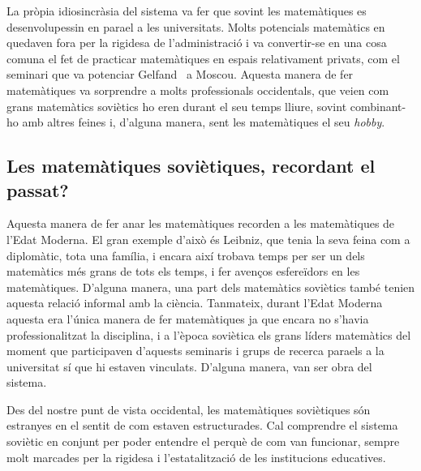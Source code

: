 \documentclass[a4paper, 11pt]{article}
\begin{document}
La pròpia idiosincràsia del sistema va fer que sovint les matemàtiques es desenvolupessin en para\lgem{}el a les
universitats. Molts potencials matemàtics en quedaven fora per la rigidesa de l'administració i va convertir-se en una
cosa comuna el fet de practicar matemàtiques en espais relativament privats, com el seminari que va potenciar
Gelfand~\cite{bib:wiki:gelfand} a Moscou. Aquesta manera de fer matemàtiques va sorprendre a molts professionals
occidentals, que veien com grans matemàtics soviètics ho eren durant el seu temps lliure, sovint combinant-ho amb
altres feines i, d'alguna manera, sent les matemàtiques el seu \textit{hobby}.

\subsection*{Les matemàtiques soviètiques, recordant el passat?}

Aquesta manera de fer anar les matemàtiques recorden a les matemàtiques de l'Edat Moderna. El gran exemple d'això és
Leibniz, que tenia la seva feina com a diplomàtic, tota una família, i encara així trobava temps per ser un dels
matemàtics més grans de tots els temps, i fer avenços esfereïdors en les matemàtiques. D'alguna manera, una part dels
matemàtics soviètics també tenien aquesta relació informal amb la ciència. Tanmateix, durant l'Edat Moderna aquesta era
l'única manera de fer matemàtiques ja que encara no s'havia professionalitzat la disciplina, i a l'època soviètica els
grans líders matemàtics del moment que participaven d'aquests seminaris i grups de recerca para\lgem{}els a la
universitat sí que hi estaven vinculats. D'alguna manera, van ser obra del sistema.

Des del nostre punt de vista occidental, les matemàtiques soviètiques són estranyes en el sentit de com estaven
estructurades. Cal comprendre el sistema soviètic en conjunt per poder entendre el perquè de com van funcionar, sempre
molt marcades per la rigidesa i l'estatalització de les institucions educatives.

\printbibliography{}
\end{document}
